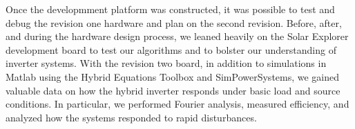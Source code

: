 Once the developmment platform was constructed, it was possible to test and debug the revision one hardware and plan on the second revision. Before, after, and during the hardware design process, we leaned heavily on the Solar Explorer development board to test our algorithms and to bolster our understanding of inverter systems. With the revision two board, in addition to simulations in Matlab using the Hybrid Equations Toolbox and SimPowerSystems, we gained valuable data on how the hybrid inverter responds under basic load and source conditions. In particular, we performed Fourier analysis, measured efficiency, and analyzed how the systems responded to rapid disturbances.




